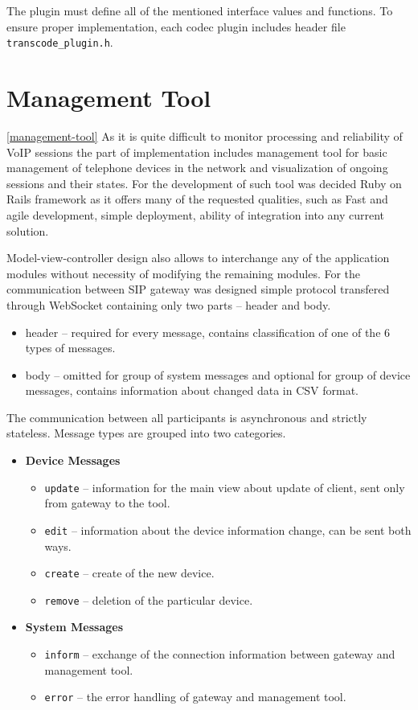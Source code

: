 The plugin must define all of the mentioned interface values and functions.
To ensure proper implementation, each codec plugin includes header file 
\texttt{transcode\_plugin.h}.


\section{Management Tool}\ref{management-tool}
As it is quite difficult to monitor processing and reliability of VoIP sessions
the part of implementation includes management tool for basic management of 
telephone devices in the network and visualization of ongoing sessions and 
their states. For the development of such tool was decided Ruby on Rails 
framework as it offers many of the requested qualities, such as Fast and agile 
development, simple deployment, ability of integration into any current 
solution. 

Model-view-controller design also allows to interchange any of the application
modules without necessity of modifying the remaining modules. For the
communication between SIP gateway was designed simple protocol transfered
through WebSocket containing only two parts -- header and body.

\begin{itemize}
\item header -- required for every message, contains classification of one of 
the 6 types of messages.
\item body -- omitted for group of system messages and optional for group of 
device messages, contains information about changed data in CSV format.
\end{itemize}   

The communication between all participants is asynchronous and strictly 
stateless. Message types are grouped into two categories.

\begin{itemize}
\item \textbf{Device Messages}
\begin{itemize}
\item \texttt{update} -- information for the main view about update of client, 
sent only from gateway to the tool.
\item \texttt{edit} -- information about the device information change, can be 
sent both ways.
\item \texttt{create} -- create of the new device.
\item \texttt{remove} -- deletion of the particular device.
\end{itemize}

\item \textbf{System Messages}
\begin{itemize}
\item \texttt{inform} -- exchange of the connection information between gateway and management tool.
\item \texttt{error} -- the error handling of gateway and management tool.
\end{itemize}
\end{itemize}

